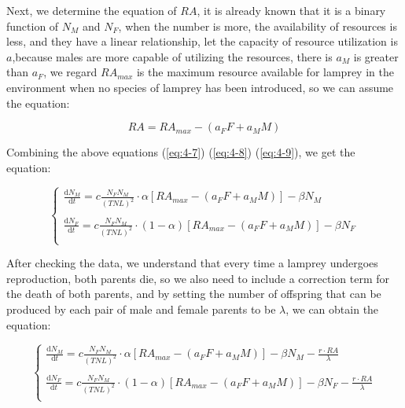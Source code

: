 \documentclass[12pt]{article}  %
\begin{document}
Next, we determine the equation of $RA$, it is already known that it is a binary function of $N_M$ and $N_F$, when the number is more, the availability of resources is less, and they have a linear relationship, let the capacity of resource utilization is $a$,because males are more capable of utilizing the resources, there is $a_M$ is greater than $a_F$, we regard $RA_{max}$ is the maximum resource available for lamprey in the environment when no species of lamprey has been introduced, so we can assume the equation:

\begin{equation}\label{eq:4-9}
RA = RA_{max} - (a_{F}F+a_{M}M)
\end{equation}

Combining the above equations (\ref{eq:4-7}) (\ref{eq:4-8}) (\ref{eq:4-9}), we get the equation:

\begin{equation}\label{eq:4-10}
	\begin{cases}
	\frac{\mathrm{d}N_{M}}{\mathrm{d}t}=c\frac{N_{F}N_{M}}{(TNL)^{2}} \cdot \alpha [RA_{max} - (a_{F}F+a_{M}M)]-\beta N_{M} \\
	\\
	\frac{\mathrm{d}N_{F}}{\mathrm{d}t}=c\frac{N_{F}N_{M}}{(TNL)^{2}} \cdot(1 - \alpha )[RA_{max} - (a_{F}F+a_{M}M)]-\beta N_{F} \\
	\end{cases}
\end{equation}

After checking the data, we understand that every time a lamprey undergoes reproduction, both parents die,\cite{7} so we also need to include a correction term for the death of both parents, and by setting the number of offspring that can be produced by each pair of male and female parents to be $\lambda$, we can obtain the equation:

\begin{equation}\label{eq:4-11}
\begin{cases}
	\frac{\mathrm{d}N_{M}}{\mathrm{d}t}=c\frac{N_{F}N_{M}}{(TNL)^{2}} \cdot \alpha [RA_{max} - (a_{F}F+a_{M}M)]-\beta N_{M}-\frac{r\cdot RA}{\lambda} \\
	\\
	\frac{\mathrm{d}N_{F}}{\mathrm{d}t}=c\frac{N_{F}N_{M}}{(TNL)^{2}} \cdot(1 - \alpha )[RA_{max} - (a_{F}F+a_{M}M)]-\beta N_{F}-\frac{r\cdot RA}{\lambda} \\
\end{cases}
\end{equation}
\end{document}
